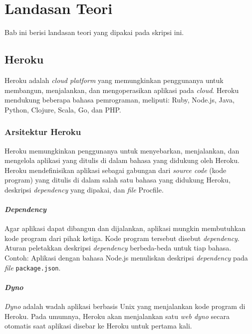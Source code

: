 
\chapter{Landasan Teori}
\label{chap:teori}
\setcounter{secnumdepth}{3}
Bab ini berisi landasan teori yang dipakai pada skripsi ini.

\section{Heroku ~\cite{heroku}}
\label{sec:Heroku}
Heroku adalah \textit{cloud platform} yang memungkinkan penggunanya untuk membangun, menjalankan, dan mengoperasikan aplikasi pada \textit{cloud}. Heroku mendukung beberapa bahasa pemrograman, meliputi: Ruby, Node.js, Java, Python, Clojure, Scala, Go, dan PHP.

\subsection{Arsitektur Heroku}
Heroku memungkinkan penggunanya untuk menyebarkan, menjalankan, dan mengelola aplikasi yang ditulis di dalam bahasa yang didukung oleh Heroku. Heroku mendefinisikan aplikasi sebagai gabungan dari \textit{source code} (kode program) yang ditulis di dalam salah satu bahasa yang didukung Heroku, deskripsi \textit{dependency} yang dipakai, dan \textit{file} Procfile. 

\subsubsection{\textit{Dependency}}
Agar aplikasi dapat dibangun dan dijalankan, aplikasi mungkin membutuhkan kode program dari pihak ketiga. Kode program tersebut disebut \textit{dependency}. Aturan peletakkan deskripsi \textit{dependency} berbeda-beda untuk tiap bahasa. Contoh: Aplikasi dengan bahasa Node.js menuliskan deskripsi \textit{dependency} pada \textit{file} \texttt{package.json}.

\subsubsection{\textit{Dyno}}
\textit{Dyno} adalah wadah aplikasi berbasis Unix yang  menjalankan kode program di Heroku. Pada umumnya, Heroku akan menjalankan satu \textit{web dyno} secara otomatis saat aplikasi disebar ke Heroku untuk pertama kali.

